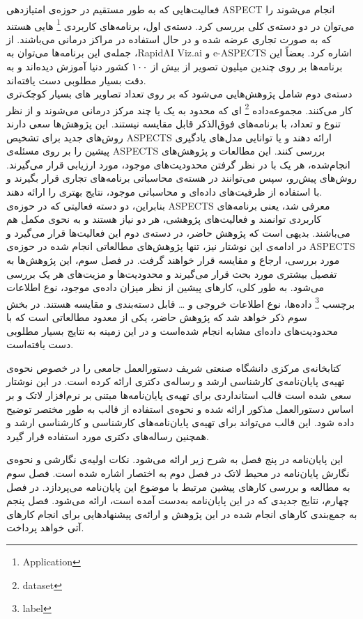فعالیت‌هایی که به طور مستقیم در حوزه‌ی امتیازدهی ASPECT انجام می‌شوند را می‌توان در دو دسته‌ی کلی بررسی کرد.
دسته‌ی اول، برنامه‌های کاربردی
\footnote{Application} ‌هایی هستند 
که به صورت تجاری عرضه شده و در حال استفاده در مراکز درمانی می‌باشند.
از جمله‌ی این برنامه‌ها می‌توان به ،RapidAI Viz.ai و e-ASPECTS اشاره کرد.
بعضاً این برنامه‌ها بر روی چندین میلیون تصویر از بیش از ۱۰۰ کشور دنیا آموزش دیده‌اند
و به دقت بسیار مطلوبی دست یافته‌اند.\\
دسته‌ی دوم شامل پژوهش‌هایی می‌شود که بر روی
تعداد تصاویر
های بسیار کوچک‌تری کار می‌کنند.
مجموعه‌داده‌
\footnote{dataset}
ای که محدود به یک یا چند مرکز درمانی می‌شوند و از نظر تنوع و تعداد،‌ با برنامه‌های فوق‌الذکر قابل مقایسه نیستند.
این پژوهش‌ها سعی دارند روش‌های جدید برای تشخیص ASPECTS ارائه دهند و یا توانایی مدل‌های یادگیری پیشین را بر روی مسئله‌ی ASPECTS بررسی کنند.
 این مطالعات و پژوهش‌های انجام‌شده، هر یک با در نظر 
 گرفتن محدودیت‌های  موجود، مورد ارزیابی قرار 
 می‌گیرند.
روش‌های پیش‌رو، سپس می‌توانند در هسته‌ی محاسباتی برنامه‌های تجاری قرار بگیرند 
و با استفاده از ظرفیت‌های داده‌ای و محاسباتی موجود، نتایج بهتری را ارائه دهند.\\
بنابراین، دو دسته فعالیتی که در حوزه‌ی ASPECTS معرفی شد، یعنی برنامه‌های کاربردی توانمند و فعالیت‌های پژوهشی، هر دو نیاز هستند و به نحوی مکمل هم می‌باشند.
بدیهی‌ است که پژوهش حاضر، در دسته‌ی دوم این فعالیت‌ها قرار می‌گیرد
و در ادامه‌ی این نوشتار نیز، تنها پژوهش‌های مطالعاتی انجام شده در حوزه‌ی ASPECTS مورد بررسی، ارجاع و مقایسه قرار خواهند گرفت.
در فصل سوم، این پژوهش‌ها به تفصیل بیشتری مورد 
بحث قرار می‌‌گیرند و
محدودیت‌ها و مزیت‌های هر یک بررسی می‌شود.
به طور کلی، کار‌های پیشین از نظر میزان داده‌ی موجود، نوع اطلاعات برچسب
\footnote{label}
داده‌ها،
نوع اطلاعات خروجی و
\dots 
قابل دسته‌بندی و مقایسه هستند.
در بخش سوم ذکر خواهد شد که پژوهش حاضر، یکی از معدود مطالعاتی است که با محدودیت‌های داده‌ای مشابه انجام شده‌است و 
در این زمینه به نتایج بسیار مطلوبی دست یافته‌است.


کتابخانه‌ی مرکزی دانشگاه صنعتی شریف دستورالعمل جامعی را در خصوص
نحوه‌ی تهیه‌ی پایان‌نامه‌ی کارشناسی ارشد و رساله‌ی دکتری ارائه کرده است.
در این نوشتار سعی شده است قالب استانداردی برای تهیه‌ی پایان‌نامه‌ها مبتنی بر نرم‌افزار لاتک و
بر اساس دستورالعمل مذکور ارائه شده و
نحوه‌ی استفاده از قالب به طور مختصر توضیح داده شود.
این قالب  می‌تواند برای تهیه‌ی پایان‌نامه‌های کارشناسی و کارشناسی ارشد 
و همچنین رساله‌ها‌ی دکتری مورد استفاده قرار گیرد.


این پایان‌نامه در پنج فصل به شرح زیر ارائه می‌شود.
نکات اولیه‌ی نگارشی و نحوه‌ی نگارش پایان‌نامه در محیط لاتک در  فصل دوم به اختصار اشاره شده است. 
فصل سوم به مطالعه و بررسی کارهای پیشین مرتبط با موضوع این پایان‌نامه می‌پردازد.
در فصل چهارم، نتایج جدیدی که در این پایان‌نامه به‌دست آمده است، ارائه می‌شود.
فصل پنجم به جمع‌بندی کارهای انجام شده در این پژوهش و ارائه‌ی پیشنهادهایی برای انجام کارهای آتی خواهد پرداخت.